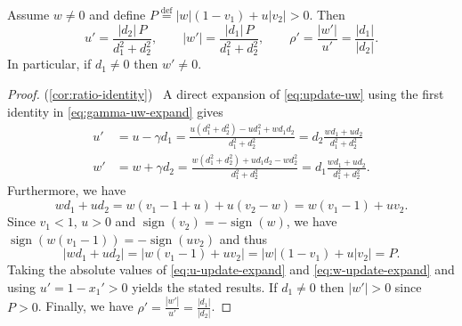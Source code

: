 \documentclass{article}
\DeclareMathOperator{\sign}{sign}
\newcommand{\defi}{\stackrel{\mathrm{\scriptscriptstyle def}}{=}}
\newcommand{\newtarget}[1]{\hypertarget{#1}{}}
\newcommand\linkofproof[1]{(\cref{#1})\newtarget{proof:#1}\ }
\begin{document}
\begin{corollary}\label{cor:ratio-identity}
Assume $w\neq 0$ and define
$P \defi  |w|(1-v_1)+u|v_2|>0$. Then
\[
    u'=\frac{|d_2|\,P}{d_1^2+d_2^2},
    \qquad
    |w'|=\frac{|d_1|\,P}{d_1^2+d_2^2},
    \qquad
    \rho'=\frac{|w'|}{u'}=\frac{|d_1|}{|d_2|}.
\]
In particular, if $d_1\neq 0$ then $w'\neq 0$.
\end{corollary}
\begin{proof}\linkofproof{cor:ratio-identity}
    A direct expansion of \eqref{eq:update-uw} using the first identity in \eqref{eq:gamma-uw-expand} gives
    \begin{align}
        u' &= u-\gamma d_1
        =\frac{u(d_1^2 + d_2^2) - ud_1^2+ w d_1 d_2}{d_1^2+d_2^2}
        = d_2 \frac{w d_1 + u d_2}{d_1^2+d_2^2}\label{eq:u-update-expand}\\
        w' &= w+\gamma d_2
        = \frac{w(d_1^2 + d_2^2) + u d_1 d_2 - w d_2^2}{d_1^2+d_2^2}
        = d_1 \frac{w d_1 + u d_2}{d_1^2+d_2^2}\label{eq:w-update-expand}.
    \end{align}
    Furthermore, we have
    \[
        w d_1 + u d_2 = w(v_1-1+u) + u (v_2-w) = w(v_1-1) + u v_2.
    \]
    Since $v_1 < 1$, $u>0$ and $\sign(v_2) = -\sign(w)$, we have $\sign(w(v_1-1)) = - \sign(uv_2)$ and thus
    \[
        |w d_1 + u d_2| = |w(v_1-1) + u v_2| = |w|(1-v_1)+u|v_2|=P.
    \]
    Taking the absolute values of \eqref{eq:u-update-expand} and \eqref{eq:w-update-expand} and using $u' = 1- x_1' > 0$ yields the stated results.
    If $d_1\neq 0$ then $|w'|>0$ since $P>0$.
    Finally, we have $\rho'=\frac{|w'|}{u'} = \frac{|d_1|}{|d_2|}$.
\end{proof}
\end{document}

